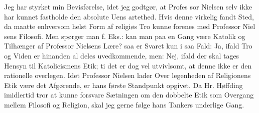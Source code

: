 \documentclass[12pt,a4paper,openany]{book}
\newcommand{\opage}[1]{\marginnote{\footnotesize\textit{[#1]}}}
\begin{document}
Jeg har styrket min Bevisførelse, idet jeg godtgør, at Profes\-%
sor Nielsen selv ikke har kunnet fastholde den absolute Uens\-%
artethed. Hvis denne virkelig fandt Sted, da maatte enhversom%
\opage{19}helst Form af religiøs Tro kunne forenes med Professor Niel\-%
sens Filosofi. Men spørger man f. Eks.: kan man paa en Gang
være Katolik og Tilhænger af Professor Nielsens Lære? saa er
Svaret kun i saa Fald: Ja, ifald Tro og Viden er hinanden al\-%
deles uvedkommende, men: Nej, ifald der skal tages Hensyn til
Katolicismens Etik; ti det er dog vel utvivlsomt, at denne ikke
er den rationelle overlegen. Idet Professor Nielsen lader Over\-%
legenheden af Religionens Etik være det Afgørende, er hans
første Standpunkt opgivet. Da Hr. Høffding imidlertid tror at
kunne forsvare Sætningen om den dobbelte Etik som Overgang
mellem Filosofi og Religion, skal jeg gerne følge hans Tankers
underlige Gang.
\end{document}
